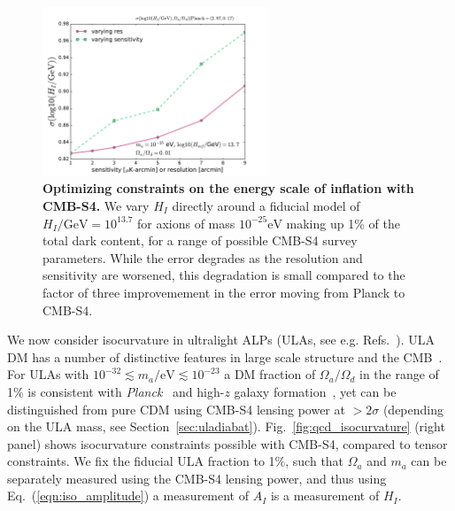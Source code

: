 \begin{figure}[htbp!]
\begin{center}
\includegraphics[width=0.6\textwidth]{Inflation/ALP_iso_mass_m25_Hi_sensitivity_resolution.pdf}
\caption{\textbf{Optimizing constraints on the energy scale of inflation with CMB-S4.} We vary $H_I$ directly around a fiducial model of $H_I/\text{GeV} = 10^{13.7}$ for axions of mass $10^{-25} \mathrm{eV}$ making up 1\% of the total dark content, for a range of possible CMB-S4 survey parameters. While the error degrades as the resolution and sensitivity are worsened, this degradation is small compared to the factor of three improvemement in the error moving from Planck to CMB-S4. \label{fig:optimize_axioniso}}
\end{center}
\end{figure}

We now consider isocurvature in ultralight ALPs (ULAs, see e.g. Refs.~\cite{Marsh:2013taa,Marsh:2014qoa}). ULA DM has a number of distinctive features in large scale structure and the CMB~\cite{Hlozek:2014lca,Marsh:2013ywa}. For ULAs with $10^{-32}\lesssim m_a/\text{eV}\lesssim 10^{-23}$ a DM fraction of $\Omega_a/\Omega_d$ in the range of 1\% is consistent with \emph{Planck}~\cite{Hlozek:2014lca} and high-$z$ galaxy formation~\cite{Bozek:2014uqa,Schive:2015kza}, yet can be distinguished from pure CDM using CMB-S4 lensing power at $>2\sigma$ (depending on the ULA mass, see Section~\ref{sec:uladiabat}). Fig.~\ref{fig:qcd_isocurvature} (right panel) shows isocurvature constraints possible with CMB-S4, compared to tensor constraints. We fix the fiducial ULA fraction to 1\%, such that $\Omega_a$ and $m_a$ can be separately measured using the CMB-S4 lensing power, and thus using Eq.~(\ref{eqn:iso_amplitude}) a measurement of $A_I$ is a measurement of $H_I$. 

